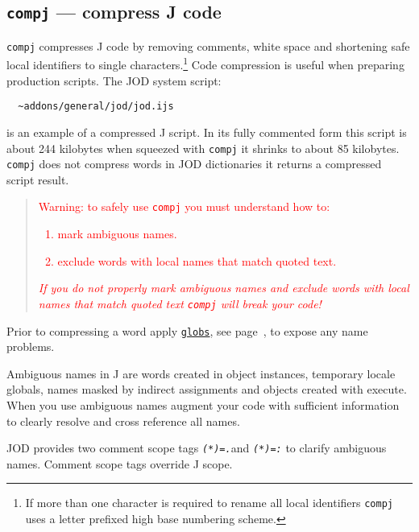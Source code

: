 \subsection{\texttt{compj} --- compress J code}

  \texttt{compj} compresses J code by
  removing comments, white space and shortening safe local identifiers to single
  characters.\footnote{If more than one character is required to rename all
  local identifiers \texttt{compj} uses a letter prefixed high base numbering scheme. }
  Code compression is useful when preparing production scripts. The
  JOD system script:
  
\begin{verbatim}
  ~addons/general/jod/jod.ijs
\end{verbatim}

 \noindent is an example of a compressed J script. In its fully commented
  form this script is about 244 kilobytes when squeezed with
  \texttt{compj} it shrinks to about 85 kilobytes.
  \texttt{compj} does not compress words in JOD
  dictionaries it returns a compressed script result.
  
\begin{quotation}
 \noindent\textcolor{red}{Warning: to safely use
	  \texttt{compj} you must understand how to:
     \begin{enumerate} 
      \item mark ambiguous names.
      \item exclude words with local names that
        match quoted text. 
     \end{enumerate}
	  \emph{If you do not properly mark ambiguous names and exclude words
     with local names that match quoted text 
    \texttt{compj} will break your code!}}
\end{quotation}
  
  Prior to compressing a word apply \hyperlink{il:globs}{\texttt{globs}}, 
  see page~\pageref{ss:globs}, to expose any name problems.

  Ambiguous names in J are words created in object instances,
  temporary locale globals, names masked by indirect assignments and objects
  created with execute. When you use ambiguous names augment your code with
  sufficient information to clearly resolve and cross reference
   all names. 
  
  JOD provides two comment scope tags
   \textcolor{CodeComment}{\texttt{\textsl{(*)=.}}}and
  \textcolor{CodeComment}{\texttt{\textsl{(*)=:}}} to clarify ambiguous names.  Comment
  scope tags override J scope.  

